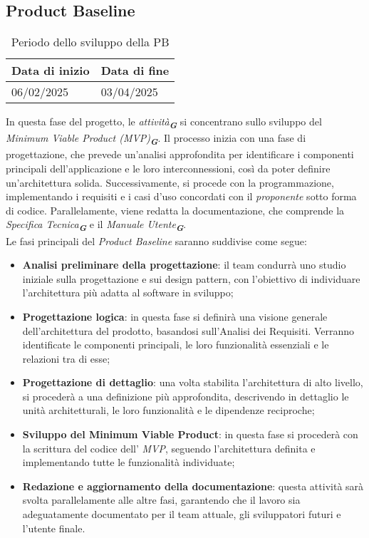 \subsection{Product Baseline}
\label{sec:product baseline}
\begin{table}[h!]
    \centering
    \renewcommand{\arraystretch}{1.5} %
    \begin{tabularx}{\textwidth}{|X|X|}\hline
    \rowcolor[HTML]{FFD700} 
    \textbf{Data di inizio} & \textbf{Data di fine} \\ \hline
    06/02/2025 & 03/04/2025 \\ \hline
    \end{tabularx}
    \caption{Periodo dello sviluppo della PB}
\end{table}
In questa fase del progetto, le {\emph{attività}}\textsubscript{\textit{\textbf{G}}} si concentrano sullo sviluppo del {\emph{Minimum Viable Product (MVP)}}\textsubscript{\textit{\textbf{G}}}. 
Il processo inizia con una fase di progettazione, che prevede un’analisi approfondita per identificare i componenti principali dell’applicazione e le loro interconnessioni, così da poter definire un’architettura solida. 
Successivamente, si procede con la programmazione, implementando i requisiti e i casi d’uso concordati con il \emph{proponente} sotto forma di codice. 
Parallelamente, viene redatta la documentazione, che comprende la {\emph{Specifica Tecnica}}\textsubscript{\textit{\textbf{G}}} e il {\emph{Manuale Utente}}\textsubscript{\textit{\textbf{G}}}.\\
Le fasi principali del \emph{Product Baseline} saranno suddivise come segue:
\begin{itemize}
\item \textbf{Analisi preliminare della progettazione}: il team condurrà uno studio iniziale sulla progettazione e sui design pattern, con l’obiettivo di individuare l’architettura più adatta al software in sviluppo;
\item \textbf{Progettazione logica}: in questa fase si definirà una visione generale dell’architettura del prodotto, basandosi sull’Analisi dei Requisiti. Verranno identificate le componenti principali, le loro funzionalità essenziali e le relazioni tra di esse;
\item \textbf{Progettazione di dettaglio}: una volta stabilita l’architettura di alto livello, si procederà a una definizione più approfondita, descrivendo in dettaglio le unità architetturali, le loro funzionalità e le dipendenze reciproche;
\item \textbf{Sviluppo del Minimum Viable Product}: in questa fase si procederà con la scrittura del codice dell’ \emph{MVP}, seguendo l’architettura definita e implementando tutte le funzionalità individuate;
\item \textbf{Redazione e aggiornamento della documentazione}: questa attività sarà svolta parallelamente alle altre fasi, garantendo che il lavoro sia adeguatamente documentato per il team attuale, gli sviluppatori futuri e l’utente finale.
\end{itemize}

